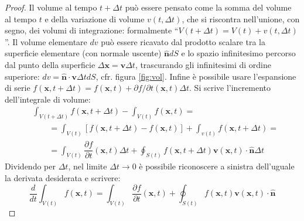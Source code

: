 \begin{proof}
Il volume al tempo $t+\Delta t$ può essere pensato come la somma del volume al tempo $t$ 
 e della variazione di volume $v(t,\Delta t)$, che si riscontra nell'unione, con segno, dei volumi 
 di integrazione: formalmente ``$V(t+\Delta t)=V(t)+v(t,\Delta t)$''. Il volume elementare 
 $d v$ può essere ricavato dal prodotto scalare tra la superficie elementare (con normale uscente)
 $\bm{\hat{n}} dS$ e lo spazio infinitesimo percorso dal punto della superficie $\Delta \bm{x}=\bm{v}\Delta t$,
 trascurando gli infinitesimi di ordine superiore:
 $dv = \bm{\hat{n}}\cdot \bm{v} \Delta t dS$, cfr. figura \ref{fig:vol}. Infine è possibile usare l'espansione di serie
 $f(\bm{x},t+\Delta t) = f(\bm{x},t) + \partial f / \partial t (\bm{x},t) \Delta t$.
 Si scrive l'incremento dell'integrale di volume:
\begin{equation}
\begin{aligned}
 &  \int_{V(t+\Delta t)} f(\bm{x},t+\Delta t) -  \int_{V(t)} f(\bm{x},t) = \\
 & \qquad =   \int_{V(t)} \left[ f(\bm{x},t+\Delta t) -  f(\bm{x},t) \right]
            + \int_{v(t)}        f(\bm{x},t+\Delta t) = \\
 & \qquad =  \int_{V(t)} \dfrac{\partial f}{\partial t}(\bm{x},t) \Delta t
            + \oint_{S(t)} f(\bm{x},t+\Delta t)\bm{v}(\bm{x},t) \cdot \bm{\hat{n}} \Delta t
\end{aligned}
\end{equation}
Dividendo per $\Delta t$, nel limite $\Delta t \rightarrow 0$ è possibile riconoscere a sinistra dell'uguale
 la derivata desiderata e scrivere:
\begin{equation}
  \frac{d}{dt}\int_{V(t)} f(\bm{x},t) = 
  \int_{V(t)} \frac{\partial f}{\partial t}(\bm{x},t) + 
  \oint_{S(t)} f(\bm{x},t) \bm{v}(\bm{x},t) \cdot \bm{\hat{n}}
\end{equation}
\end{proof}
%
%
\vspace{-0.5cm}
